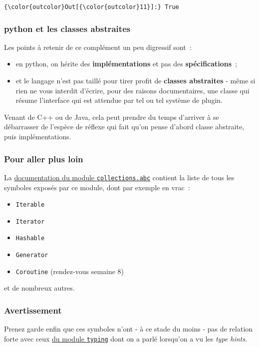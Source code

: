 \begin{Verbatim}[commandchars=\\\{\}]
{\color{outcolor}Out[{\color{outcolor}11}]:} True
\end{Verbatim}
            
    \hypertarget{python-et-les-classes-abstraites}{%
\subsubsection{python et les classes
abstraites}\label{python-et-les-classes-abstraites}}

    Les points à retenir de ce complément un peu digressif sont~:

\begin{itemize}
\tightlist
\item
  en python, on hérite des \textbf{implémentations} et pas des
  \textbf{spécifications}~;
\item
  et le langage n'est pas taillé pour tirer profit de \textbf{classes
  abstraites} - même si rien ne vous interdit d'écrire, pour des raisons
  documentaires, une classe qui résume l'interface qui est attendue par
  tel ou tel système de plugin.
\end{itemize}

    Venant de C++ ou de Java, cela peut prendre du temps d'arriver à se
débarrasser de l'espèce de réflexe qui fait qu'on pense d'abord classe
abstraite, puis implémentations.

    \hypertarget{pour-aller-plus-loin}{%
\subsubsection{Pour aller plus loin}\label{pour-aller-plus-loin}}

    La
\href{https://docs.python.org/3/library/collections.abc.html}{documentation
du module \texttt{collections.abc}} contient la liste de tous les
symboles exposés par ce module, dont par exemple en vrac~:

\begin{itemize}
\tightlist
\item
  \texttt{Iterable}
\item
  \texttt{Iterator}
\item
  \texttt{Hashable}
\item
  \texttt{Generator}
\item
  \texttt{Coroutine} (rendez-vous semaine 8)
\end{itemize}

et de nombreux autres.

    \hypertarget{avertissement}{%
\subsubsection{Avertissement}\label{avertissement}}

    Prenez garde enfin que ces symboles n'ont - à ce stade du moins - pas de
relation forte avec ceux
\href{https://docs.python.org/3/library/typing.html}{du module
\texttt{typing}} dont on a parlé lorsqu'on a vu les \emph{type hints}.